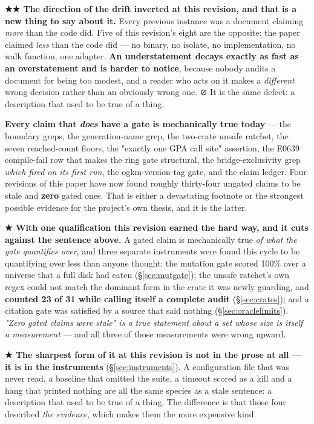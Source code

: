 \documentclass[10.5pt]{article}
\begin{document}
\begin{claimbox}\small
\textbf{★★ The direction of the drift inverted at this revision, and that is a new thing to say
about it.} Every previous instance was a document claiming \emph{more} than the code did. Five of
this revision's eight are the opposite: the paper claimed \emph{less} than the code did — no
binary, no isolate, no  implementation, no walk function, one adapter. \textbf{An
understatement decays exactly as fast as an overstatement and is harder to notice}, because
nobody audits a document for being too modest, and a reader who acts on it makes a
\emph{different} wrong decision rather than an obviously wrong one. ⊘ It is the same defect: a
description that used to be true of a thing.
\end{claimbox}

\textbf{Every claim that \emph{does} have a gate is mechanically true today} — the boundary greps,
the generation-name grep, the two-crate unsafe ratchet, the seven reached-count floors, the
"exactly one GPA call site" assertion, the E0639 compile-fail row that makes the ring gate
structural, the bridge-exclusivity grep \emph{which fired on its first run}, the ogkm-version-tag
gate, and the claim ledger. Four revisions of this paper have now found roughly thirty-four
ungated claims to be stale and \textbf{zero} gated ones. That is either a devastating footnote or
the strongest possible evidence for the project's own thesis, and it is the latter.

\textbf{★ With one qualification this revision earned the hard way, and it cuts against the
sentence above.} A gated claim is mechanically true \emph{of what the gate quantifies over}, and
three separate instruments were found this cycle to be quantifying over less than anyone thought:
the mutation gate scored 100\% over a universe that a full disk had eaten
(\S\ref{sec:mutgate}); the unsafe ratchet's own regex could not match the dominant form in the
crate it was newly guarding, and \textbf{counted 23 of 31 while calling itself a complete audit}
(\S\ref{sec:crates}); and a citation gate was satisfied by a source that said nothing
(\S\ref{sec:oraclelimits}). \emph{"Zero gated claims were stale" is a true statement about a set
whose size is itself a measurement} — and all three of those measurements were wrong upward.

\textbf{★ The sharpest form of it at this revision is not in the prose at all — it is in the
instruments} (\S\ref{sec:instruments}). A configuration file that was never read, a baseline that
omitted the suite, a timeout scored as a kill and a hang that printed nothing are all the same
species as a stale sentence: a description that used to be true of a thing. The difference is that
those four described \emph{the evidence}, which makes them the more expensive kind.
\end{document}
